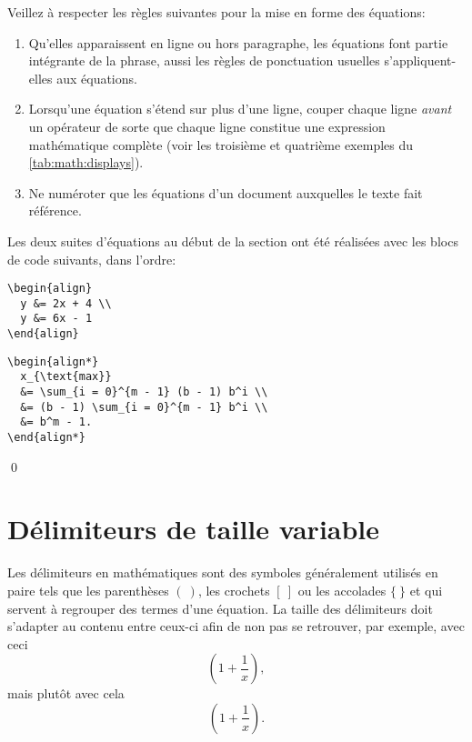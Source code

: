 \begin{conseil}
  Veillez à respecter les règles suivantes pour la mise en forme des
  équations:
  \begin{enumerate}
  \item Qu'elles apparaissent en ligne ou hors paragraphe, les
    équations font partie intégrante de la phrase, aussi les règles de
    ponctuation usuelles s'appliquent-elles aux équations.
  \item Lorsqu'une équation s'étend sur plus d'une ligne, couper
    chaque ligne \emph{avant} un opérateur de sorte que chaque ligne
    constitue une expression mathématique complète (voir les troisième
    et quatrième exemples du \autoref{tab:math:displays}).
  \item Ne numéroter que les équations d'un document auxquelles le
    texte fait référence.
  \end{enumerate}
\end{conseil}

\begin{exemple}
  Les deux suites d'équations au début de la section ont été réalisées
  avec les blocs de code suivants, dans l'ordre:
\begin{lstlisting}
\begin{align}
  y &= 2x + 4 \\
  y &= 6x - 1
\end{align}
\end{lstlisting}
\begin{lstlisting}
\begin{align*}
  x_{\text{max}}
  &= \sum_{i = 0}^{m - 1} (b - 1) b^i \\
  &= (b - 1) \sum_{i = 0}^{m - 1} b^i \\
  &= b^m - 1.
\end{align*}
\end{lstlisting}
  \qed
\end{exemple}


\section{Délimiteurs de taille variable}
\label{sec:math:delimiteurs}

Les délimiteurs en mathématiques sont des symboles généralement
utilisés en paire tels que les parenthèses $(~)$, les crochets $[~]$
ou les accolades $\{~\}$ et qui servent à regrouper des termes d'une
équation. La taille des délimiteurs doit s'adapter au contenu entre
ceux-ci afin de non pas se retrouver, par exemple, avec ceci
\begin{equation*}
  (1 + \frac{1}{x}),
\end{equation*}
mais plutôt avec cela
\begin{equation*}
  \left( 1 + \frac{1}{x} \right).
\end{equation*}

